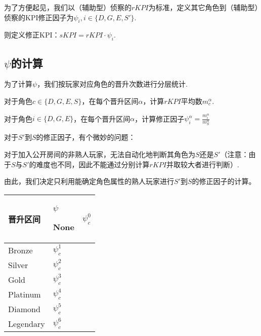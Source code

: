 \documentclass{ctexart}
\begin{document}
为了方便起见，我们以（辅助型）侦察的$rKPI$为标准，定义其它角色到（辅助型）侦察的KPI修正因子为$\psi_i, i \in \{D, G, E, S'\}$.

则定义修正KPI：$sKPI = rKPI \cdot \psi_i$.

\subsection{$\psi$的计算}

为了计算$\psi$，我们按玩家对应角色的晋升次数进行分层统计.

对于角色$c \in \{D, G, E, S\}$，在每个晋升区间$\alpha$，计算$rKPI$平均数$m_c^\alpha$.

对于角色$i \in \{D, G, E\}$，在每个晋升区间$\alpha$，计算修正因子$\psi_i^\alpha = \frac{m_i^\alpha}{m_S^\alpha}$

对于$S'$到$S$的修正因子，有个微妙的问题：

对于加入公开房间的非熟人玩家，无法自动化地判断其角色为$S$还是$S'$（注意：由于$S$与$S'$的难度也不同，因此不能通过分别计算$rKPI$并取较大者进行判断）.

由此，我们决定只利用能确定角色属性的熟人玩家进行$S'$到$S$的修正因子的计算。

\begin{longtable}{|>{\centering\arraybackslash}p{6em}|>{\centering\arraybackslash}p{4em}|}
    \hline

    晋升区间      & $\psi$ \endhead

    \hline

    None      & $\psi_c^0$      \\

    \hline

    Bronze    & $\psi_c^1$      \\

    \hline

    Silver    & $\psi_c^2$      \\

    \hline

    Gold      & $\psi_c^3$      \\

    \hline

    Platinum  & $\psi_c^4$      \\

    \hline

    Diamond   & $\psi_c^5$      \\

    \hline

    Legendary & $\psi_c^6$      \\

    \hline
\end{longtable}
\end{document}
